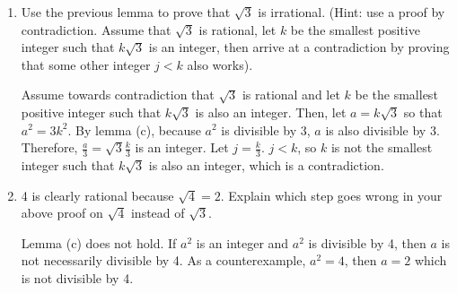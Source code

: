 \documentclass{article}
\begin{document}
\begin{enumerate}
\begin{enumerate}
\begin{mdframed}
        \end{mdframed}
        \item Use the previous lemma to prove that $\sqrt{3}$ is irrational. (Hint: use a proof by contradiction. Assume that $\sqrt{3}$ is rational, let $k$ be the smallest positive integer such that $k\sqrt{3}$ is an integer, then arrive at a contradiction by proving that some other integer $j < k$ also works). 
        \begin{mdframed}
        Assume towards contradiction that $\sqrt{3}$ is rational and let $k$ be the smallest positive integer such that $k\sqrt{3}$ is also an integer. Then, let $a = k\sqrt{3}$ so that $a^2 = 3k^2$. By lemma (c), because $a^2$ is divisible by 3, $a$ is also divisible by 3. Therefore, $\frac{a}{3} = \sqrt{3}\frac{k}{3}$ is an integer. Let $j = \frac{k}{3}$. $j < k$, so $k$ is not the smallest integer such that $k\sqrt{3}$ is also an integer, which is a contradiction.
        \end{mdframed}
        \item 4 is clearly rational because $\sqrt{4} = 2$. Explain which step goes wrong in your above proof on $\sqrt{4}$ instead of $\sqrt{3}$.
        \begin{mdframed}
        Lemma (c) does not hold. If $a^2$ is an integer and $a^2$ is divisible by 4, then $a$ is not necessarily divisible by 4. As a counterexample, $a^2 = 4$, then $a = 2$ which is not divisible by 4.
        \end{mdframed}
    \end{enumerate}
        
    
\end{enumerate}
\end{document}
